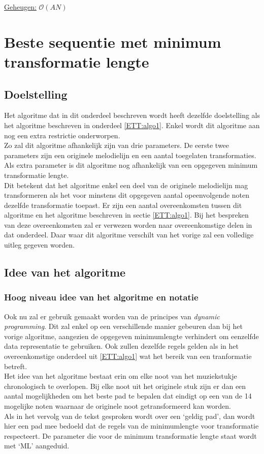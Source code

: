 \begin{center}
\underline{Geheugen:} $\mathcal{O}(AN)$
\end{center}

\section{Beste sequentie met minimum transformatie lengte}
\label{ETT:algo2}

\subsection{Doelstelling}
Het algoritme dat in dit onderdeel beschreven wordt heeft dezelfde doelstelling als het algoritme beschreven in onderdeel \ref{ETT:algo1}. Enkel wordt dit algoritme aan nog een extra restrictie onderworpen.\\ 
Zo zal dit algoritme afhankelijk zijn van drie parameters. De eerste twee parameters zijn een originele melodielijn en een aantal toegelaten transformaties. Als extra parameter is dit algoritme nog afhankelijk van een opgegeven minimum transformatie lengte.\\ 
Dit betekent dat het algoritme enkel een deel van de originele melodielijn mag transformeren als het voor minstens dit opgegeven aantal opeenvolgende noten dezelfde transformatie toepast. Er zijn een aantal overeenkomsten tussen dit algoritme en het algoritme beschreven in sectie \ref{ETT:algo1}. Bij het bespreken van deze overeenkomsten zal er verwezen worden naar overeenkomstige delen in dat onderdeel. Daar waar dit algoritme verschilt van het vorige zal een volledige uitleg gegeven worden.

\subsection{Idee van het algoritme}
\subsubsection{Hoog niveau idee van het algoritme en notatie}
Ook nu zal er gebruik gemaakt worden van de principes van \textit{dynamic programming}. Dit zal enkel op een verschillende manier gebeuren dan bij het vorige algoritme, aangezien de opgegeven minimumlengte verhindert om eenzelfde data representatie te gebruiken. Ook zullen dezelfde regels gelden als in het overeenkomstige onderdeel uit \ref{ETT:algo1} wat het bereik van een tranformatie betreft.\\ 
Het idee van het algoritme bestaat erin om elke noot van het muziekstukje chronologisch te overlopen. Bij elke noot uit het originele stuk zijn er dan een aantal mogelijkheden om het beste pad te bepalen dat eindigt op een van de 14 mogelijke noten waarnaar de originele noot getransformeerd kan worden.\\ 
Als in het vervolg van de tekst gesproken wordt over een `geldig pad', dan wordt hier een pad mee bedoeld dat de regels van de minimumlengte voor transformatie respecteert. De parameter die voor de minimum transformatie lengte staat wordt met `ML' aangeduid.

